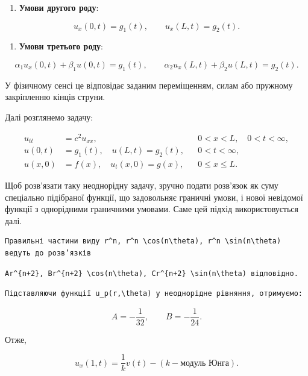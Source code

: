 \documentclass[
  ukrainian,
]{article}
\providecommand{\tightlist}{%
  \setlength{\itemsep}{0pt}\setlength{\parskip}{0pt}}
\begin{document}
\begin{enumerate}
\def\labelenumi{\arabic{enumi}.}
\setcounter{enumi}{1}
\tightlist
\item
  \textbf{Умови другого роду}:
\end{enumerate}

\[
u_x(0,t)=g_1(t), \qquad u_x(L,t)=g_2(t).
\]

\begin{enumerate}
\def\labelenumi{\arabic{enumi}.}
\setcounter{enumi}{2}
\tightlist
\item
  \textbf{Умови третього роду}:
\end{enumerate}

\[
\alpha_1 u_x(0,t)+\beta_1 u(0,t)=g_1(t), \qquad
\alpha_2 u_x(L,t)+\beta_2 u(L,t)=g_2(t).
\]

У фізичному сенсі це відповідає заданим переміщенням, силам або пружному
закріпленню кінців струни.

Далі розглянемо задачу:

\[
\begin{aligned}
u_{tt} &= c^2u_{xx}, && 0 < x < L,\quad 0 < t < \infty, \\
u(0,t) &= g_1(t), \quad u(L,t) = g_2(t), && 0 < t < \infty, \\
u(x,0) &= f(x), \quad u_t(x,0) = g(x), && 0 \leqslant x \leqslant L.
\end{aligned}
\]

Щоб розв'язати таку неоднорідну задачу, зручно подати розв'язок як суму
спеціально підібраної функції, що задовольняє граничні умови, і нової
невідомої функції з однорідними граничними умовами. Саме цей підхід
використовується далі.

\begin{verbatim}
Правильні частини виду r^n, r^n \cos(n\theta), r^n \sin(n\theta) ведуть до розв’язків
\end{verbatim}

\begin{verbatim}
Ar^{n+2}, Br^{n+2} \cos(n\theta), Cr^{n+2} \sin(n\theta) відповідно.
\end{verbatim}

\begin{verbatim}
Підставляючи функції u_p(r,\theta) у неоднорідне рівняння, отримуємо:
\end{verbatim}

\[
A = -\frac{1}{32}, \qquad B = -\frac{1}{24}.
\]

Отже,

\[
u_x(1,t) = \frac{1}{k} v(t) - (k - \text{модуль Юнга}).
\]
\end{document}
